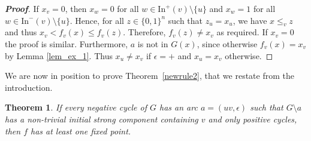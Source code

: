 \documentclass[11pt,a4paper]{article}
\newtheorem{theorem}{Theorem}
\def\B{\{0,1\}}
\def\In{\mathrm{In}}
\def\e{\epsilon}
\begin{document}
\begin{proof}[{\bf Proof}]
If $x_v=0$, then $x_w=0$ for all $w\in\In^+(v)\setminus \{u\}$ and $x_w=1$ for all $w\in\In^-(v)\setminus\{u\}$. Hence, for all $z\in\B^n$ such that $z_u=x_u$, we have $x\leq_v z$ and thus $x_v<f_v(x)\leq f_v(z)$. Therefore, $f_v(z)\neq x_v$ as required. If $x_v=0$ the proof is similar. Furthermore, $a$ is not in $G(x)$, since otherwise $f_v(x)=x_v$ by Lemma \ref{lem_ex_1}. Thus $x_u\neq x_v$ if $\e=+$ and $x_u=x_v$ otherwise. 
\end{proof}

We are now in position to prove Theorem~\ref{newrule2}, that we restate from the introduction. 

\setcounter{theorem}{4}

\begin{theorem}
If every negative cycle of $G$ has an arc $a=(uv,\epsilon)$ such that $G\setminus a$ has a non-trivial initial strong component containing $v$ and only positive cycles, then $f$ has at least one fixed point.
\end{theorem}
\end{document}
